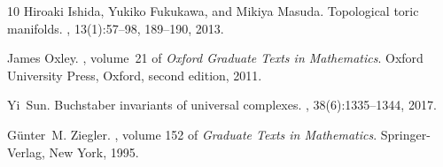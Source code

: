 \documentclass{amsart}
\theoremstyle{plain}
\numberwithin{equation}{section}
\theoremstyle{remark}
\theoremstyle{definition}
\begin{document}
\begin{thebibliography}{10}
Hiroaki Ishida, Yukiko Fukukawa, and Mikiya Masuda.
\newblock Topological toric manifolds.
, 13(1):57--98, 189--190, 2013.

James Oxley.
, volume~21 of {\em Oxford Graduate Texts in Mathematics}.
\newblock Oxford University Press, Oxford, second edition, 2011.

Yi~Sun.
\newblock Buchstaber invariants of universal complexes.
, 38(6):1335--1344, 2017.

G{\"u}nter~M. Ziegler.
, volume 152 of {\em Graduate Texts in Mathematics}.
\newblock Springer-Verlag, New York, 1995.

\end{thebibliography}
\end{document}
